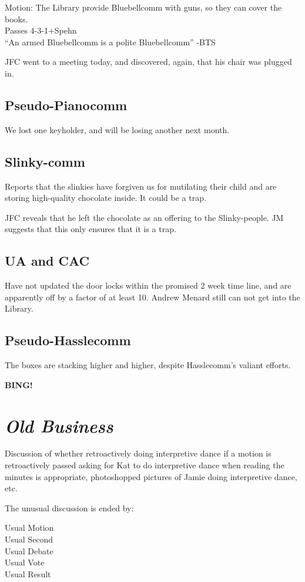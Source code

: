 \documentclass[12pt]{article}
\newcommand{\bing}{{\bf BING!} }
\newcommand{\goto}[1]{\bing \vskip 12pt \section*{{\em{#1}}}}
\begin{document}
Motion: The Library provide Bluebellcomm with guns, so they can cover
the books.\\
Passes 4-3-1+Spehn\\
``An armed Bluebellcomm is a polite Bluebellcomm'' -BTS

JFC went to a meeting today, and discovered, again, that his chair was
plugged in.

\subsection{Pseudo-Pianocomm}

We lost one keyholder, and will be losing another next month.

\subsection{Slinky-comm}

 Reports that the slinkies have forgiven us for mutilating
their child and are storing high-quality chocolate inside.
It could be a trap.

JFC reveals that he left the chocolate as an offering to the
Slinky-people. JM suggests that this only ensures that it is a trap.

\subsection{UA and CAC}

Have not updated the door locks within the promised 2 week time line,
and are apparently off by a factor of at least 10.  Andrew Menard
still can not get into the Library.

\subsection{Pseudo-Hasslecomm}

The boxes are stacking higher and higher, despite Hasslecomm's valiant efforts.

\goto{Old Business}

Discussion of whether retroactively doing interpretive dance if a
motion is retroactively passed asking for Kat to do interpretive dance
when reading the minutes is appropriate, photoshopped pictures of
Jamie doing interpretive dance, etc.

The unusual discussion is ended by:

Usual Motion\\
Usual Second\\
Usual Debate\\
Usual Vote\\
Usual Result\\
\end{document}
